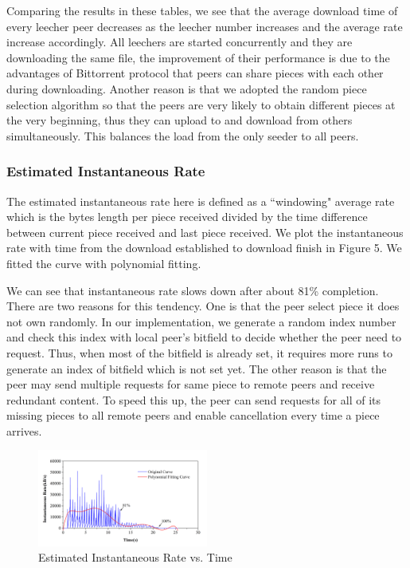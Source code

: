 \documentclass[conference]{IEEEtran}
\begin{document}
	Comparing the results in these tables, we see that the average download time of every leecher peer decreases as the leecher number increases and the average rate
	increase accordingly. All leechers are started concurrently and they are downloading the same file, the improvement of their performance is due to the advantages of Bittorrent protocol that peers can share pieces with each other during downloading. Another reason is that we adopted the random piece selection algorithm so that the peers are very likely to obtain different pieces at the very beginning, thus they can upload to and download from others simultaneously. This balances the load from the only seeder to all peers.
	
	\subsubsection{Estimated Instantaneous Rate}
	The estimated instantaneous rate here is defined as a ``windowing" average rate which is the bytes length per piece received divided by the time difference between current piece received and last piece received. We plot the instantaneous rate with time from the download established to download finish in Figure 5. We fitted the curve with polynomial fitting. 
	
	We can see that instantaneous rate slows down after about 81\% completion. There are two reasons for this tendency. One is that the peer select piece it does not own randomly. In our implementation, we generate a random index number and check this index with local peer's bitfield to decide whether the peer need to request. Thus, when most of the bitfield is already set, it requires more runs to generate an index of bitfield which is not set yet. The other reason is that the peer may send multiple requests for same piece to remote peers and receive redundant content. To speed this up, the peer can send requests for all of its missing pieces to all remote peers and enable cancellation every time a piece arrives.
	
	\begin{figure}
		\centering
		\includegraphics[width=0.5\textwidth]{Graph5.png}
		\caption{Estimated Instantaneous Rate vs. Time}
		\label{fig:side:f}
	\end{figure}
	
\end{document}
